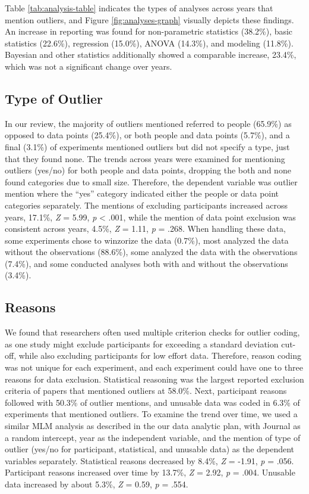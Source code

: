 \documentclass[english,man]{apa6}
\theoremstyle{definition}
\theoremstyle{definition}
\theoremstyle{definition}
\theoremstyle{remark}
\begin{document}
Table \ref{tab:analysis-table} indicates the types of analyses across
years that mention outliers, and Figure \ref{fig:analyses-graph}
visually depicts these findings. An increase in reporting was found for
non-parametric statistics (38.2\%), basic statistics (22.6\%),
regression (15.0\%), ANOVA (14.3\%), and modeling (11.8\%). Bayesian and
other statistics additionally showed a comparable increase, 23.4\%,
which was not a significant change over years.

\subsection{Type of Outlier}\label{type-of-outlier}

In our review, the majority of outliers mentioned referred to people
(65.9\%) as opposed to data points (25.4\%), or both people and data
points (5.7\%), and a final (3.1\%) of experiments mentioned outliers
but did not specify a type, just that they found none. The trends across
years were examined for mentioning outliers (yes/no) for both people and
data points, dropping the both and none found categories due to small
size. Therefore, the dependent variable was outlier mention where the
\enquote{yes} category indicated either the people or data point
categories separately. The mentions of excluding participants increased
across years, 17.1\%, \emph{Z} = 5.99, \emph{p} \textless{} .001, while
the mention of data point exclusion was consistent across years, 4.5\%,
\emph{Z} = 1.11, \emph{p} = .268. When handling these data, some
experiments chose to winzorize the data (0.7\%), most analyzed the data
without the observations (88.6\%), some analyzed the data with the
observations (7.4\%), and some conducted analyses both with and without
the observations (3.4\%).

\subsection{Reasons}\label{reasons}

We found that researchers often used multiple criterion checks for
outlier coding, as one study might exclude participants for exceeding a
standard deviation cut-off, while also excluding participants for low
effort data. Therefore, reason coding was not unique for each
experiment, and each experiment could have one to three reasons for data
exclusion. Statistical reasoning was the largest reported exclusion
criteria of papers that mentioned outliers at 58.0\%. Next, participant
reasons followed with 50.3\% of outlier mentions, and unusable data was
coded in 6.3\% of experiments that mentioned outliers. To examine the
trend over time, we used a similar MLM analysis as described in the our
data analytic plan, with Journal as a random intercept, year as the
independent variable, and the mention of type of outlier (yes/no for
participant, statistical, and unusable data) as the dependent variables
separately. Statistical reasons decreased by 8.4\%, \emph{Z} = -1.91,
\emph{p} = .056. Participant reasons increased over time by 13.7\%,
\emph{Z} = 2.92, \emph{p} = .004. Unusable data increased by about
5.3\%, \emph{Z} = 0.59, \emph{p} = .554.
\end{document}
